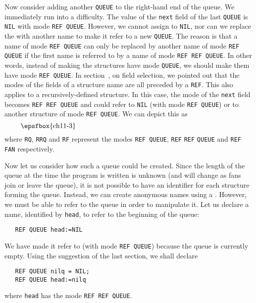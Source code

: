 Now consider adding another \verb|QUEUE| to the right-hand end of the
queue. We immediately run into a difficulty. The value of the
\verb|next| field of the last \verb|QUEUE| is \verb|NIL| with mode
\verb|REF QUEUE|. However, we cannot assign to \verb|NIL|, nor can we
replace the   with another
name to make it refer to a new \verb|QUEUE|. The reason is that a name
of mode \verb|REF QUEUE| can only be replaced by another name of mode
\verb|REF QUEUE| if the first name is referred to by a name of mode
\verb|REF REF QUEUE|. In other words, instead of making the structures
have mode \verb|QUEUE|, we should make them have mode \verb|REF QUEUE|.
In section~, on field selection, we pointed out that
the modes of the fields of a structure name are all preceded by a
\verb|REF|. This also applies to a recursively-defined structure. In
this case, the mode of the \verb|next| field becomes
\verb|REF REF QUEUE| and could refer to \verb|NIL| (with mode
\verb|REF QUEUE|) or to another structure of mode \verb|REF QUEUE|. We
can depict this as
$$\vbox{\epsfbox{ch11-3}}$$
where \verb|RQ|, \verb|RRQ| and \verb|RF| represent the modes
\verb|REF QUEUE|, \verb|REF| \verb|REF| \verb|QUEUE| and
\verb|REF FAN| respectively.

Now let us consider how such a queue could be created. Since the length
of the queue at the time the program is written is unknown (and will
change as fans join or leave the queue), it is not possible to have an
identifier for each structure forming the queue. Instead, we can create
anonymous names using a . However, we must be
able to refer to the queue in order to manipulate it. Let us declare a
name, identified by \verb|head|, to refer to the beginning of the
queue:
\begin{verbatim}
   REF QUEUE head:=NIL
\end{verbatim}
\noindent
We have made it refer to  (with mode
\verb|REF QUEUE|) because the queue is currently empty. Using the
suggestion of the last section, we shall declare
\begin{verbatim}
   REF QUEUE nilq = NIL;
   REF QUEUE head:=nilq
\end{verbatim}
\noindent
where \verb|head| has the mode \verb|REF REF QUEUE|.

